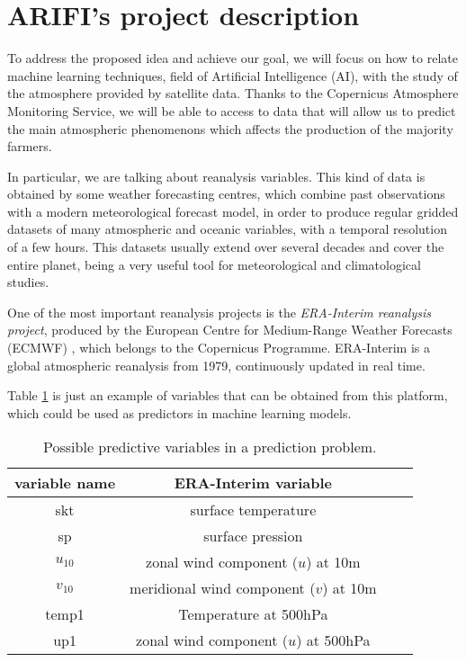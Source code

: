 \section{ARIFI's project description}

To address the proposed idea and achieve our goal, we will focus on how to relate machine learning techniques, field of Artificial Intelligence (AI), with the study of the atmosphere provided by satellite data. Thanks to the Copernicus Atmosphere Monitoring Service, we will be able to access to data that will allow us to predict the main atmospheric phenomenons which affects the production of the majority farmers.

In particular, we are talking about reanalysis variables. This kind of data is obtained by some weather forecasting centres, which combine past observations with a modern meteorological forecast model, in order to produce regular gridded datasets of many atmospheric and oceanic variables, with a temporal resolution of a few hours. This datasets usually extend over several decades and cover the entire planet, being a very useful tool for meteorological and climatological studies.

One of the most important reanalysis projects is the {\em ERA-Interim reanalysis project}, produced by the European Centre for Medium-Range Weather Forecasts (ECMWF) \cite{ERA_Interim}, which belongs to the Copernicus Programme. ERA-Interim is a global atmospheric reanalysis from 1979, continuously updated in real time.

Table \ref{Variables_ERA} is just an example of variables that can be obtained from this platform, which could be used as predictors in machine learning models.

\vspace{12pt}
\begin{table}[H]
\begin{center}
\caption{\label{Variables_ERA} Possible predictive variables in a prediction problem.}
\begin{tabular}{cccc}
\hline
variable name & ERA-Interim variable\\
\hline
\hline
skt & surface temperature\\
sp & surface pression\\
$u_{10}$& zonal wind component ($u$) at 10m\\
$v_{10}$& meridional wind component ($v$) at 10m\\
temp1& Temperature at 500hPa\\
up1& zonal wind component ($u$) at 500hPa\\
\hline
\end{tabular}
\end{center}
\end{table}
\vspace{12pt}

